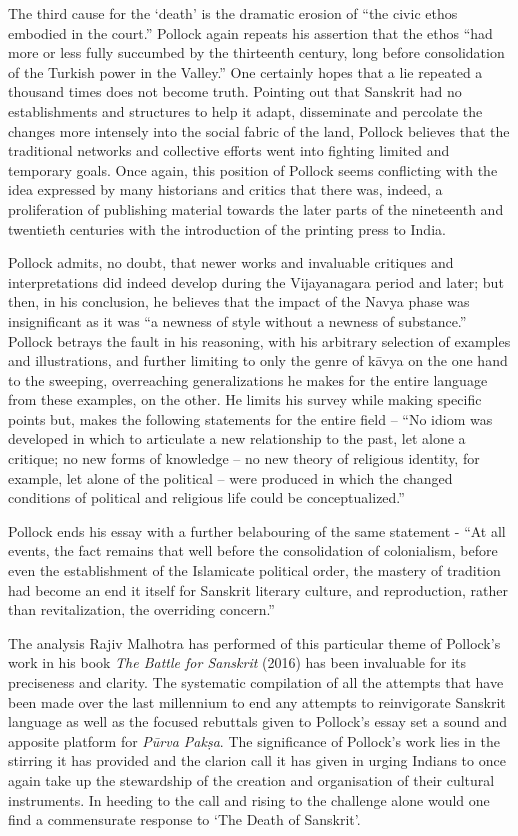 The third cause for the ‘death’ is the dramatic erosion of “the civic ethos embodied in the court.” Pollock again repeats his assertion that the ethos “had more or less fully succumbed by the thirteenth century, long before consolidation of the Turkish power in the Valley.” One certainly hopes that a lie repeated a thousand times does not become truth. Pointing out that Sanskrit had no establishments and structures to help it adapt, disseminate and percolate the changes more intensely into the social fabric of the land, Pollock believes that the traditional networks and collective efforts went into fighting limited and temporary goals. Once again, this position of Pollock seems conflicting with the idea expressed by many historians and critics that there was, indeed, a proliferation of publishing material towards the later parts of the nineteenth and twentieth centuries with the introduction of the printing press to India.
\newpage

Pollock admits, no doubt, that newer works and invaluable critiques and interpretations did indeed develop during the Vijayanagara period and later; but then, in his conclusion, he believes that the impact of the Navya phase was insignificant as it was “a newness of style without a newness of substance.” Pollock betrays the fault in his reasoning, with his arbitrary selection of examples and illustrations, and further limiting to only the genre of kāvya on the one hand to the sweeping, overreaching generalizations he makes for the entire language from these examples, on the other. He limits his survey while making specific points but, makes the following statements for the entire field – “No idiom was developed in which to articulate a new relationship to the past, let alone a critique; no new forms of knowledge – no new theory of religious identity, for example, let alone of the political – were produced in which the changed conditions of political and religious life could be conceptualized.”

Pollock ends his essay with a further belabouring of the same statement - “At all events, the fact remains that well before the consolidation of colonialism, before even the establishment of the Islamicate political order, the mastery of tradition had become an end it itself for Sanskrit literary culture, and reproduction, rather than revitalization, the overriding concern.”   

The analysis Rajiv Malhotra has performed of this particular theme of Pollock’s work in his book {\sl The Battle for Sanskrit} (2016) has been invaluable for its preciseness and clarity. The systematic compilation of all the attempts that have been made over the last millennium to end any attempts to reinvigorate Sanskrit language as well as the focused rebuttals given to Pollock’s essay set a sound and apposite platform for {\sl Pūrva Pakṣa}. The significance of Pollock’s work lies in the stirring it has provided and the clarion call it has given in urging Indians to once again take up the stewardship of the creation and organisation of their cultural instruments. In heeding to the call and rising to the challenge alone would one find a commensurate response to ‘The Death of Sanskrit’.
\newpage

